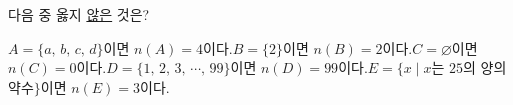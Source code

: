 다음 중 옳지 \underline{않은} 것은?
\begin{choicesv}{$A=\{a,\,b,\,c,\,d\}$이면 $n(A)=4$이다.}{$B=\{2\}$이면 $n(B)=2$이다.}{$C=\varnothing$이면 $n(C)=0$이다.}{$D=\{1,\,2,\,3,\,\cdots,\,99\}$이면 $n(D)=99$이다.}{$E=\{x \mid x$는 $25$의 양의 약수$\}$이면 $n(E)=3$이다.}\end{choicesv}
